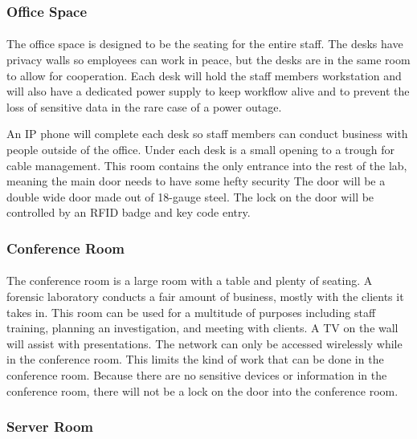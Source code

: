 \documentclass{article}
\begin{document}
\subsubsection{Office Space}
\paragraph{} The office space is designed to be the seating for the entire staff.  
The desks have privacy walls so employees can work in peace, but the desks are in the same room to allow for cooperation.  
Each desk will hold the staff members workstation and will also have a dedicated power supply to keep workflow alive and to prevent the loss of sensitive data in the rare case of a power outage. 


An IP phone will complete each desk so staff members can conduct business with people outside of the office.
Under each desk is a small opening to a trough for cable management.
This room contains the only entrance into the rest of the lab, meaning the main door needs to have some hefty security
The door will be a double wide door made out of 18-gauge steel.
The lock on the door will be controlled by an RFID badge and key code entry.
\subsubsection{Conference Room}
\paragraph{}
The conference room is a large room with a table and plenty of seating.  
A forensic laboratory conducts a fair amount of business, mostly with the clients it takes in.
This room can be used for a multitude of purposes including staff training, planning an investigation, and meeting with clients.
A TV on the wall will assist with presentations.
The network can only be accessed wirelessly while in the conference room.
This limits the kind of work that can be done in the conference room.
Because there are no sensitive devices or information in the conference room, there will not be a lock on the door into the conference room.

\subsubsection{Server Room}
\end{document}
